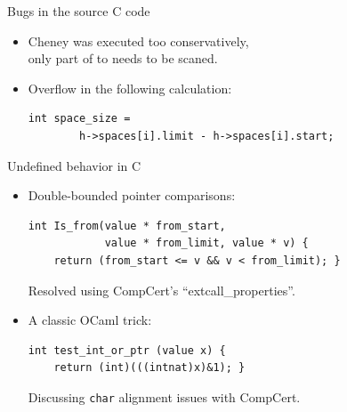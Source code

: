 \documentclass[professionalfonts, xcolor=table]{beamer}
\begin{document}
\begin{frame}[fragile]{Bugs in the source C code}
  \begin{itemize}
  \item Cheney was executed too conservatively,\\ only part of
    \textsf{to} needs to be scaned.
  \pause
\item Overflow in the following calculation:\\
\begin{verbatim}
int space_size =
        h->spaces[i].limit - h->spaces[i].start;
\end{verbatim}
  \end{itemize}
\end{frame}

\begin{frame}[fragile]{Undefined behavior in C}

  \begin{itemize}
  \item Double-bounded pointer comparisons:
    \begin{Verbatim}
int Is_from(value * from_start,
            value * from_limit, value * v) {
    return (from_start <= v && v < from_limit); }
    \end{Verbatim}
    Resolved using CompCert's ``extcall\_properties''.
    \pause
  \item A classic OCaml trick:
    \begin{Verbatim}
int test_int_or_ptr (value x) {
    return (int)(((intnat)x)&1); }
    \end{Verbatim}
    Discussing \texttt{char} alignment issues with CompCert.
  \end{itemize}
\end{frame}


\end{document}
